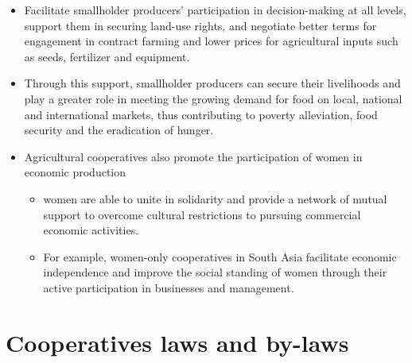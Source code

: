 \documentclass[12pt,ignorenonframetext,aspectratio=169]{beamer}
\providecommand{\tightlist}{%
  \setlength{\itemsep}{0pt}\setlength{\parskip}{0pt}}
\begin{document}
\begin{frame}{}
\protect\hypertarget{section-5}{}
\footnotesize

\begin{itemize}
\tightlist
\item
  Facilitate smallholder producers' participation in decision-making at
  all levels, support them in securing land-use rights, and negotiate
  better terms for engagement in contract farming and lower prices for
  agricultural inputs such as seeds, fertilizer and equipment.
\item
  Through this support, smallholder producers can secure their
  livelihoods and play a greater role in meeting the growing demand for
  food on local, national and international markets, thus contributing
  to poverty alleviation, food security and the eradication of hunger.
\item
  Agricultural cooperatives also promote the participation of women in
  economic production

  \begin{itemize}
  \tightlist
  \item
    women are able to unite in solidarity and provide a network of
    mutual support to overcome cultural restrictions to pursuing
    commercial economic activities.
  \item
    For example, women-only cooperatives in South Asia facilitate
    economic independence and improve the social standing of women
    through their active participation in businesses and management.
  \end{itemize}
\end{itemize}
\end{frame}

\hypertarget{cooperatives-laws-and-by-laws}{%
\section{Cooperatives laws and
by-laws}\label{cooperatives-laws-and-by-laws}}
\end{document}
